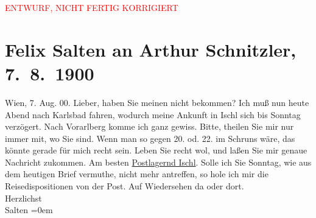 
\begin{center}
            \textcolor{red}{ENTWURF, NICHT FERTIG KORRIGIERT}
                      \end{center}
            
         \renewcommand{\erwaehnteOrte}{Orte: Bad Ischl, Karlsbad, Pressbaum, Schruns, Vorarlberg, Wien}
         \renewcommand{\erwaehnteWerke}{}
               \section[Felix Salten an Arthur Schnitzler, 7. 8. 1900]{ Felix Salten an Arthur Schnitzler, 7. 8. 1900}\nopagebreak{}\rehead{ }\begin{ledgroupsized}[t]{13cm}\normalsize\beginnumbering \toendnotes[C]{\smallbreak\pagebreak[2]} 
\toendnotes[C]{\smallbreak}\pstart
           \raggedleft{}{\pb}Wien, 7. Aug. 00.\pend
           \pstart
           Lieber, haben Sie meinen \label{K_L03308-1v}\label{K_L03308-1h} nicht bekommen? Ich muß nun heute Abend nach Karlsbad fahren, wodurch meine Ankunft in Ischl sich bis Sonntag verzögert. Nach Vorarlberg komme ich ganz gewiss. Bitte, theilen Sie mir nur
               immer mit, wo Sie sind. Wenn man so gegen 20. od. 22. im
                  Schruns wäre, das könnte gerade für mich
               recht sein. \pend
           \pstart
           {\pb}Leben Sie recht wol, und
               laßen Sie mir genaue Nachricht zukommen. Am besten \uline{Postlagernd Ischl}.\pend
           \pstart
           Solle ich Sie Sonntag, wie aus dem heutigen Brief vermuthe, nicht mehr antreffen, so
               hole ich mir die Reisedispositionen von der Post.\pend
           \pstart
           Auf Wiedersehen da oder dort.{\\[\baselineskip]}Herzlichst{\\[\baselineskip]}\spacefill\mbox{Salten}\pend
           \leftskip=0em{}
         
         \endnumbering{}\end{ledgroupsized}\begin{anhang}\end{anhang}\newcommand{\dateiname}{L03308}\newcommand{\titel}{Felix Salten an Arthur Schnitzler, 7. 8. 1900}\newcommand{\editorInnen}{Martin Anton Müller und Laura Untner}
      